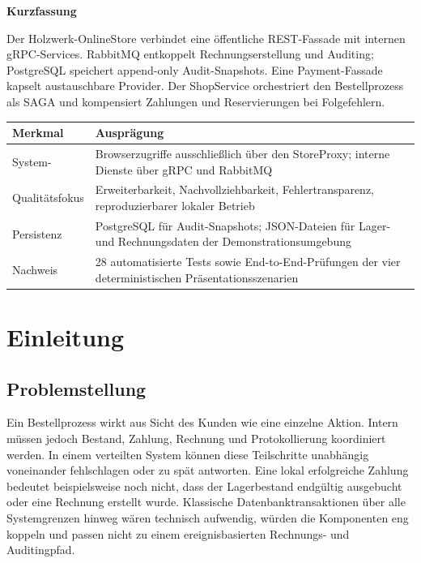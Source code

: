 \documentclass[10pt,a4paper]{article}
\newcommand{\littleGap}{\vspace{8mm}}
\begin{document}
\begin{minipage}[t]{0.58\textwidth}
  \tableofcontents
\end{minipage}\hfill
\begin{minipage}[t]{0.37\textwidth}
  \vspace{11mm}
  \colorbox{PrimaryLight}{%
    \parbox{\dimexpr\linewidth-2\fboxsep\relax}{%
      \sffamily\small\textbf{\color{Primary}Kurzfassung}\par
      \vspace{3pt}
      \rmfamily\small
      Der Holzwerk-OnlineStore verbindet eine öffentliche REST-Fassade mit
      internen gRPC-Services. RabbitMQ entkoppelt Rechnungserstellung und
      Auditing; PostgreSQL speichert append-only Audit-Snapshots. Eine
      Payment-Fassade kapselt austauschbare Provider. Der ShopService
      orchestriert den Bestellprozess als SAGA und kompensiert Zahlungen und
      Reservierungen bei Folgefehlern.
    }}
\end{minipage}

\vspace{7mm}
\begin{tabularx}{\textwidth}{@{}p{31mm}Y@{}}
  \toprule
  \textbf{\sffamily Merkmal} & \textbf{\sffamily Ausprägung}\\
  \midrule
  System- & Browserzugriffe ausschließlich über den StoreProxy; interne
    Dienste über gRPC und RabbitMQ\\
  Qualitätsfokus & Erweiterbarkeit, Nachvollziehbarkeit, Fehlertransparenz,
    reproduzierbarer lokaler Betrieb\\
  Persistenz & PostgreSQL für Audit-Snapshots; JSON-Dateien für Lager- und
    Rechnungsdaten der Demonstrationsumgebung\\
  Nachweis & 28 automatisierte Tests sowie End-to-End-Prüfungen der vier
    deterministischen Präsentationsszenarien\\
  \bottomrule
\end{tabularx}

\newpage
\section{Einleitung}
\littleGap
\subsection{Problemstellung}
Ein Bestellprozess wirkt aus Sicht des Kunden wie eine einzelne Aktion. Intern
müssen jedoch Bestand, Zahlung, Rechnung und Protokollierung koordiniert werden.
In einem verteilten System können diese Teilschritte unabhängig voneinander
fehlschlagen oder zu spät antworten. Eine lokal erfolgreiche Zahlung bedeutet
beispielsweise noch nicht, dass der Lagerbestand endgültig ausgebucht oder eine
Rechnung erstellt wurde. Klassische Datenbanktransaktionen über alle
Systemgrenzen hinweg wären technisch aufwendig, würden die Komponenten eng
koppeln und passen nicht zu einem ereignisbasierten Rechnungs- und Auditingpfad.
\end{document}
